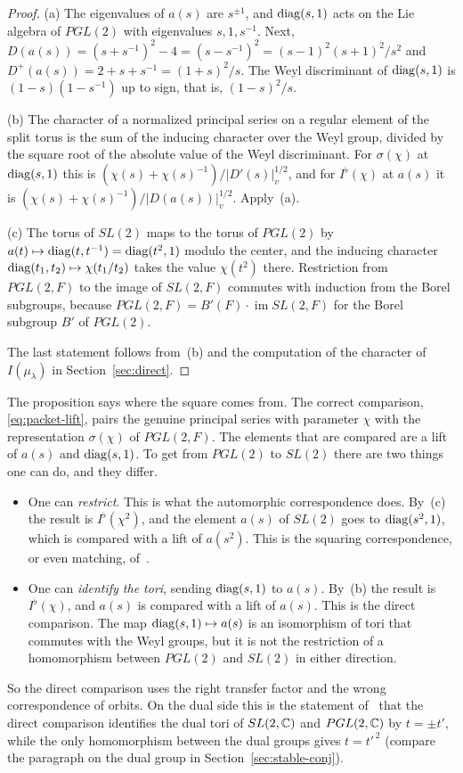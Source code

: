 \begin{proof}
(a) The eigenvalues of $a(s)$ are $s^{\pm1}$, and $\operatorname{diag}(s,1)$ acts on
the Lie algebra of $PGL(2)$ with eigenvalues $s,1,s^{-1}$. Next,
$D(a(s))=(s+s^{-1})^2-4=(s-s^{-1})^2=(s-1)^2(s+1)^2/s^2$ and
$D^+(a(s))=2+s+s^{-1}=(1+s)^2/s$. The Weyl discriminant of $\operatorname{diag}(s,1)$ is
$(1-s)(1-s^{-1})$ up to sign, that is, $(1-s)^2/s$.

(b) The character of a normalized principal series on a regular element
of the split torus is the sum of the inducing character over the Weyl
group, divided by the square root of the absolute value of the Weyl
discriminant. For $\sigma(\chi)$ at $\operatorname{diag}(s,1)$ this is
$(\chi(s)+\chi(s)^{-1})/|D'(s)|_v^{1/2}$, and for $I^\flat(\chi)$ at $a(s)$
it is $(\chi(s)+\chi(s)^{-1})/|D(a(s))|_v^{1/2}$. Apply~(a).

(c) The torus of $SL(2)$ maps to the torus of $PGL(2)$ by
$a(t)\mapsto\operatorname{diag}(t,t^{-1})=\operatorname{diag}(t^2,1)$ modulo the center, and the
inducing character $\operatorname{diag}(t_1,t_2)\mapsto\chi(t_1/t_2)$ takes the value
$\chi(t^2)$ there. Restriction from $PGL(2,F)$ to the image of $SL(2,F)$
commutes with induction from the Borel subgroups, because
$PGL(2,F)=B'(F)\cdot\operatorname{im}SL(2,F)$ for the Borel subgroup
$B'$ of $PGL(2)$.

The last statement follows from~(b) and the computation of the
character of $I(\mu_\lambda)$ in Section~\ref{sec:direct}.
\end{proof}

The proposition says where the square comes from. The correct
comparison, \eqref{eq:packet-lift}, pairs the genuine principal series
with parameter $\chi$ with the representation $\sigma(\chi)$ of
$PGL(2,F)$. The elements that are compared are a lift of $a(s)$ and
$\operatorname{diag}(s,1)$. To get from $PGL(2)$ to $SL(2)$ there are two things one
can do, and they differ.
\begin{itemize}
\item One can \emph{restrict}. This is what the automorphic
  correspondence does. By~(c) the result is $I^\flat(\chi^2)$, and the
  element $a(s)$ of $SL(2)$ goes to $\operatorname{diag}(s^2,1)$, which is compared
  with a lift of $a(s^2)$. This is the squaring correspondence, or even
  matching, of~\cite{JC26}.
\item One can \emph{identify the tori}, sending $\operatorname{diag}(s,1)$ to $a(s)$.
  By~(b) the result is $I^\flat(\chi)$, and $a(s)$ is compared with a lift
  of $a(s)$. This is the direct comparison. The map
  $\operatorname{diag}(s,1)\mapsto a(s)$ is an isomorphism of tori that commutes with
  the Weyl groups, but it is not the restriction of a homomorphism
  between $PGL(2)$ and $SL(2)$ in either direction.
\end{itemize}
So the direct comparison uses the right transfer factor and the wrong
correspondence of orbits. On the dual side this is the statement
of~\cite{JC26} that the direct comparison identifies the dual tori of
$SL(2,\mathbb{C})$ and $PGL(2,\mathbb{C})$ by $t=\pm t'$, while the only homomorphism
between the dual groups gives $t=t'^{\,2}$ (compare the paragraph on the
dual group in Section~\ref{sec:stable-conj}).

